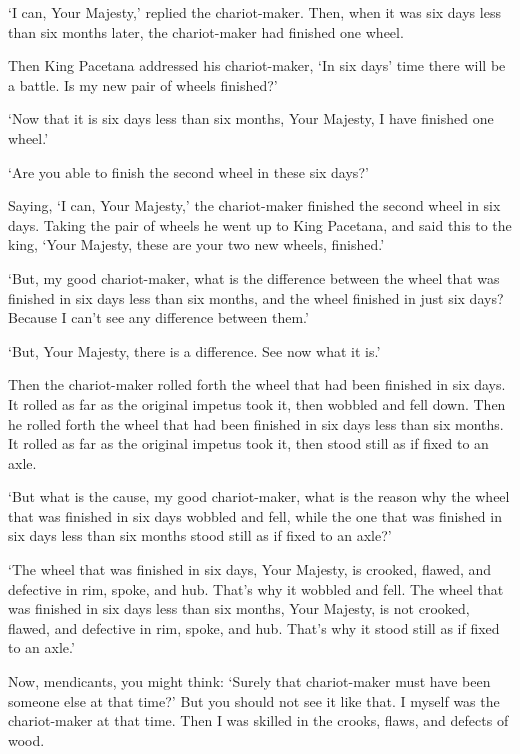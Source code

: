 \documentclass[12pt,openany]{book}%
\begin{document}
‘I can, Your Majesty,’ replied the chariot-maker. Then, when it was six days less than six months later, the chariot-maker had finished one wheel. 

Then King Pacetana addressed his chariot-maker, ‘In six days’ time there will be a battle. Is my new pair of wheels finished?’ 

‘Now that it is six days less than six months, Your Majesty, I have finished one wheel.’ 

‘Are you able to finish the second wheel in these six days?’ 

Saying, ‘I can, Your Majesty,’ the chariot-maker finished the second wheel in six days. Taking the pair of wheels he went up to King Pacetana, and said this to the king, ‘Your Majesty, these are your two new wheels, finished.’ 

‘But, my good chariot-maker, what is the difference between the wheel that was finished in six days less than six months, and the wheel finished in just six days? Because I can’t see any difference between them.’ 

‘But, Your Majesty, there is a difference. See now what it is.’ 

Then the chariot-maker rolled forth the wheel that had been finished in six days. It rolled as far as the original impetus took it, then wobbled and fell down. Then he rolled forth the wheel that had been finished in six days less than six months. It rolled as far as the original impetus took it, then stood still as if fixed to an axle. 

‘But what is the cause, my good chariot-maker, what is the reason why the wheel that was finished in six days wobbled and fell, while the one that was finished in six days less than six months stood still as if fixed to an axle?’ 

‘The wheel that was finished in six days, Your Majesty, is crooked, flawed, and defective in rim, spoke, and hub. That’s why it wobbled and fell. The wheel that was finished in six days less than six months, Your Majesty, is not crooked, flawed, and defective in rim, spoke, and hub. That’s why it stood still as if fixed to an axle.’ 

Now, mendicants, you might think: ‘Surely that chariot-maker must have been someone else at that time?’ But you should not see it like that. I myself was the chariot-maker at that time. Then I was skilled in the crooks, flaws, and defects of wood. 
\end{document}
